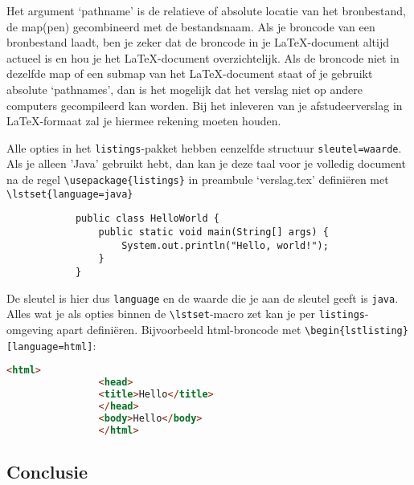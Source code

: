 	Het argument `pathname' is de relatieve of absolute locatie van het
	bronbestand, de map(pen) gecombineerd met de bestandsnaam. Als je
	broncode van een bronbestand laadt, ben je zeker dat de broncode in je
	\LaTeX{}-document altijd actueel is en hou je het \LaTeX{}-document
	overzichtelijk. Als de broncode niet in dezelfde map of een submap van
	het \LaTeX{}-document staat of je gebruikt absolute `pathnames', dan
	is het mogelijk dat het verslag niet op andere computers gecompileerd
	kan worden. Bij het inleveren van je afstudeerverslag in
	\LaTeX{}-formaat zal je hiermee rekening moeten houden.
	
	
	Alle opties in het \verb!listings!-pakket hebben eenzelfde structuur
	\verb!sleutel=waarde!. Als je alleen 'Java' gebruikt hebt, dan kan je
	deze taal voor je volledig document na de regel
	\verb!\usepackage{listings}! in preambule `verslag.tex' definiëren met
	\verb!\lstset{language=java}!
	
	\lstset{language=java}
	
	\begin{Aanpassen}
		\begin{lstlisting}
			public class HelloWorld {
				public static void main(String[] args) {
					System.out.println("Hello, world!");
				}
			}
		\end{lstlisting}
	\end{Aanpassen}
	
	
	De sleutel is hier dus \verb!language! en de waarde die je aan de
	sleutel geeft is \verb!java!. Alles wat je als opties binnen de
	\verb!\lstset!-macro zet kan je per \verb!listings!-omgeving apart
	definiëren. Bijvoorbeeld html-broncode met
	\verb!\begin{lstlisting}[language=html]!:
		
		\begin{Aanpassen}
			\begin{lstlisting}[language=html]
				<html>
				<head>
				<title>Hello</title>
				</head>
				<body>Hello</body>
				</html>
			\end{lstlisting}
		\end{Aanpassen}
		
		\subsection{Conclusie}
		
		
		

